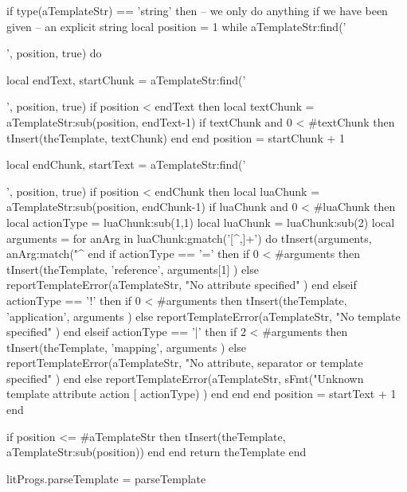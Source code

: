   if type(aTemplateStr) == 'string' then
    -- we only do anything if we have been given
    -- an explicit string
    local position = 1
    while aTemplateStr:find('{{', position, true) do

      local endText, startChunk = aTemplateStr:find('{{', position, true)
      if position < endText then
        local textChunk = aTemplateStr:sub(position, endText-1)
        if textChunk and 0 < #textChunk then
          tInsert(theTemplate, textChunk)
        end
      end
      position = startChunk + 1

      local endChunk, startText = aTemplateStr:find('}}', position, true)
      if position < endChunk then
        local luaChunk = aTemplateStr:sub(position, endChunk-1)
        if luaChunk and 0 < #luaChunk then
          local actionType = luaChunk:sub(1,1)
          local luaChunk = luaChunk:sub(2)
          local arguments = { }
          for anArg in luaChunk:gmatch('[^,]+') do
            tInsert(arguments, anArg:match("^%
          end
          if actionType == '=' then
            if 0 < #arguments then
              tInsert(theTemplate, { 'reference', arguments[1] })
            else
              reportTemplateError(aTemplateStr,
                "No attribute specified"
              )
            end
          elseif actionType == '!' then
            if 0 < #arguments then
              tInsert(theTemplate, { 'application', arguments })
            else
              reportTemplateError(aTemplateStr,
                "No template specified"
              )
            end
          elseif actionType == '|' then
            if 2 < #arguments then
              tInsert(theTemplate, { 'mapping', arguments })
            else
              reportTemplateError(aTemplateStr,
                "No attribute, separator or template specified"
              )
            end
          else
            reportTemplateError(aTemplateStr,
              sFmt("Unknown template attribute action [%
                actionType)
            )
          end
        end
      end
      position = startText + 1
    end

    if position <= #aTemplateStr then
      tInsert(theTemplate, aTemplateStr:sub(position))
    end
  end
  return theTemplate
end

litProgs.parseTemplate = parseTemplate
\stopLuaCode


}}
